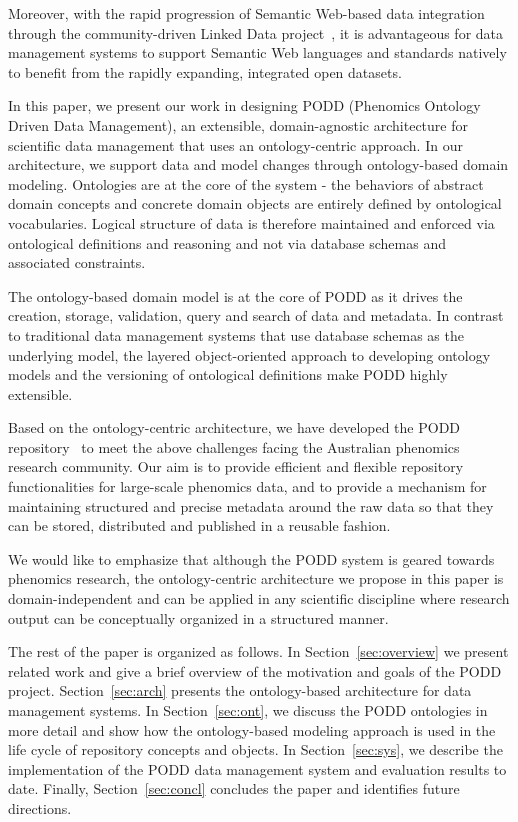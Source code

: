 \documentclass[conference,10pt]{IEEEtran}
\begin{document}
Moreover, with the rapid progression of Semantic Web-based data integration through the community-driven Linked Data project~\cite{citeulike:5008761}, it is advantageous for data management systems to support Semantic Web languages and standards natively to benefit from the rapidly expanding, integrated open datasets. 

In this paper, we present our work in designing PODD (Phenomics Ontology Driven Data Management), an extensible, domain-agnostic architecture for scientific data management that uses an ontology-centric approach. In our architecture, we support data and model changes through ontology-based domain modeling. Ontologies are at the core of the system - the behaviors of abstract domain concepts and concrete domain objects are entirely defined by ontological vocabularies. Logical structure of data is therefore maintained and enforced via ontological definitions and reasoning and not via database schemas and associated constraints. 

The ontology-based domain model is at the core of PODD as it drives the creation, storage, validation, query and search of data and metadata. In contrast to traditional data management systems that use database schemas as the underlying model, the layered object-oriented approach to developing ontology models and the versioning of ontological definitions make PODD highly extensible. 

Based on the ontology-centric architecture, we have developed the PODD repository~\cite{podd_icadl} to meet the above challenges facing the Australian phenomics research community. Our aim is to provide efficient and flexible repository functionalities for large-scale phenomics data, and to provide a mechanism for maintaining structured and precise metadata around the raw data so that they can be stored, distributed and published in a reusable fashion. 

We would like to emphasize that although the PODD system is geared towards phenomics research, the ontology-centric architecture we propose in this paper is domain-independent and can be applied in any scientific discipline where research output can be conceptually organized in a structured manner. 

The rest of the paper is organized as follows. In Section~\ref{sec:overview} we present related work and give a brief overview of the motivation and goals of the PODD project. Section~\ref{sec:arch} presents the ontology-based architecture for data management systems. In Section~\ref{sec:ont}, we discuss the PODD ontologies in more detail and show how the ontology-based modeling approach is used in the life cycle of repository concepts and objects. In Section~\ref{sec:sys}, we describe the implementation of the PODD data management system and evaluation results to date. Finally, Section~\ref{sec:concl} concludes the paper and identifies future directions.
\end{document}
